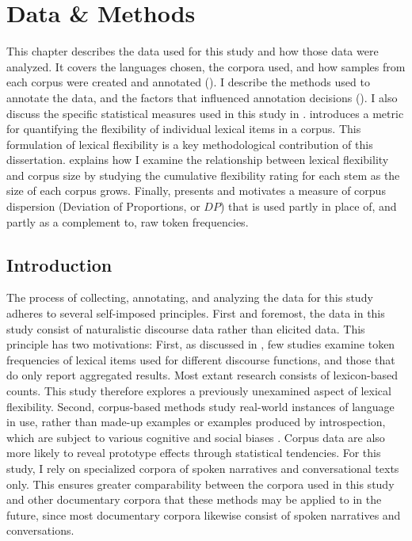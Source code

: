 \chapter{Data \& Methods}
\label{ch:methods}

This chapter describes the data used for this study and how those data were analyzed. It covers the languages chosen, the corpora used, and how samples from each corpus were created and annotated (). I describe the methods used to annotate the data, and the factors that influenced annotation decisions (). I also discuss the specific statistical measures used in this study in .  introduces a metric for quantifying the flexibility of individual lexical items in a corpus. This formulation of lexical flexibility is a key methodological contribution of this dissertation.  explains how I examine the relationship between lexical flexibility and corpus size by studying the cumulative flexibility rating for each stem as the size of each corpus grows. Finally,  presents and motivates a measure of corpus dispersion (Deviation of Proportions, or $DP$) that is used partly in place of, and partly as a complement to, raw token frequencies.

\section{Introduction}
\label{sec:3.1}

The process of collecting, annotating, and analyzing the data for this study adheres to several self-imposed principles. First and foremost, the data in this study consist of naturalistic discourse data rather than elicited data. This principle has two motivations: First, as discussed in , few studies examine token frequencies of lexical items used for different discourse functions, and those that do only report aggregated results. Most extant research consists of lexicon-based counts. This study therefore explores a previously unexamined aspect of lexical flexibility. Second, corpus-based methods study real-world instances of language in use, rather than made-up examples or examples produced by introspection, which are subject to various cognitive and social biases \parencite[168]{Baker2018}. Corpus data are also more likely to reveal prototype effects through statistical tendencies. For this study, I rely on specialized corpora of spoken narratives and conversational texts only. This ensures greater comparability between the corpora used in this study and other documentary corpora that these methods may be applied to in the future, since most documentary corpora likewise consist of spoken narratives and conversations.

